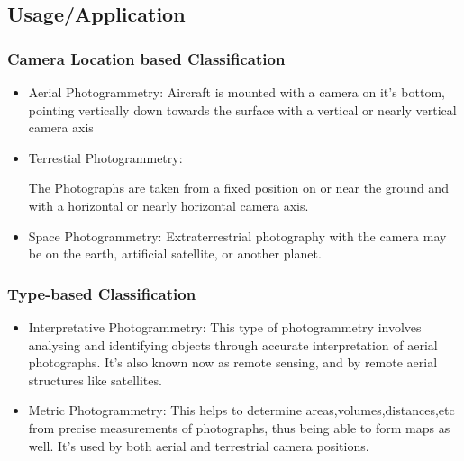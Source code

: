 \documentclass[11pt,twocolumn,letterpaper]{article}
\begin{document}
\subsection{Usage/Application}
\subsubsection{Camera Location based Classification}
\begin{itemize}
\item Aerial Photogrammetry:
Aircraft is mounted with a camera on it's bottom, pointing vertically down towards the surface with a vertical or nearly vertical camera axis
\item Terrestial Photogrammetry:

The Photographs are taken from a fixed position on or near the
ground and with a horizontal or nearly horizontal camera axis.
\item Space Photogrammetry:
Extraterrestrial photography with the camera may be on the earth, artificial satellite, or another planet.
\end{itemize}

\subsubsection{Type-based Classification}
\begin{itemize}
\item Interpretative Photogrammetry:
This type of photogrammetry involves analysing and identifying objects through accurate interpretation of aerial photographs. It's also known now as remote sensing, and by remote aerial structures like satellites.

\item Metric Photogrammetry:
This helps to determine areas,volumes,distances,etc from precise measurements of photographs, thus being able to form maps as well. It's used by both aerial and terrestrial camera positions.   
\end{itemize}
\end{document}

